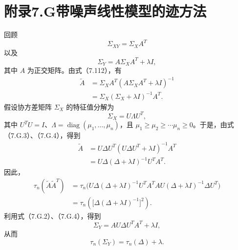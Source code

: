 \section*{附录7.G\quad 带噪声线性模型的迹方法}

回顾
\begin{equation}
\Sigma_{XY}=\Sigma_XA^T\tag{7.G.1}
\end{equation}
以及
\begin{equation}
\Sigma_Y=A\Sigma_XA^T+\lambda I,\tag{7.G.2}
\end{equation}
其中 $A$ 为正交矩阵。由式（7.112），有
\begin{equation}
\begin{aligned}
\widetilde A&=\Sigma_XA^T(A\Sigma_XA^T+\lambda I)^{-1}\\
 &=\Sigma_X(\Sigma_X+\lambda I)^{-1}A^T.
\end{aligned}\tag{7.G.3}
\end{equation}
假设协方差矩阵 $\Sigma_X$ 的特征值分解为
\begin{equation}
\Sigma_X=U\Lambda U^T,\tag{7.G.4}
\end{equation}
其中 $U^TU=I$、$\Lambda=\operatorname{diag}(\mu_1,\ldots,\mu_n)$，且 $\mu_1\ge\mu_2\ge\cdots\mu_n\ge0$。于是，由式（7.G.3）、（7.G.4），得到
\begin{equation}
\begin{aligned}
\widetilde A&=U\Delta U^T(U\Delta U^T+\lambda I)^{-1}A^T\\
 &=U\Delta(\Delta+\lambda I)^{-1}U^TA^T.
\end{aligned}\tag{7.G.5}
\end{equation}
因此，
\begin{equation}
\begin{aligned}
\tau_n(\widetilde A\widetilde A^T)
 &=\tau_n\bigl(U\Delta(\Delta+\lambda I)^{-1}U^TA^TAU
  (\Delta+\lambda I)^{-1}\Delta U^T\bigr)\\
 &=\tau_n\left(\bigl[\Delta(\Delta+\lambda I)^{-1}\bigr]^2\right).
\end{aligned}\tag{7.G.6}
\end{equation}
利用式（7.G.2）、（7.G.4），得到
\begin{equation}
\Sigma_Y=AU\Delta U^TA^T+\lambda I,\tag{7.G.7}
\end{equation}
从而
\begin{equation}
\tau_n(\Sigma_Y)=\tau_n(\Delta)+\lambda.\tag{7.G.8}
\end{equation}
